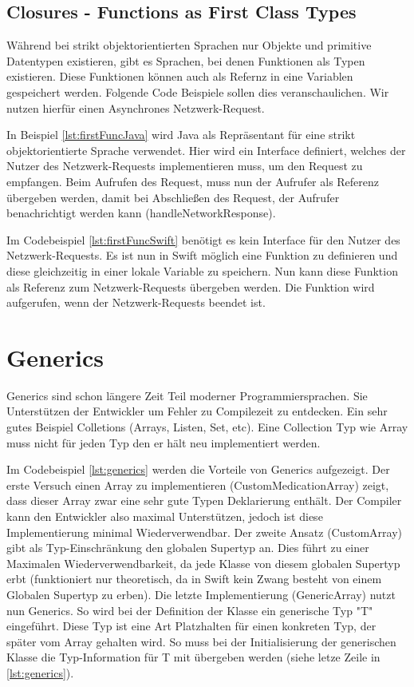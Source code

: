 \subsection{Closures - Functions as First Class Types}
Während bei strikt objektorientierten Sprachen nur Objekte und primitive Datentypen existieren, gibt es Sprachen, bei denen Funktionen als Typen existieren. Diese Funktionen können auch als Refernz in eine Variablen gespeichert werden. Folgende Code Beispiele sollen dies veranschaulichen. Wir nutzen hierfür einen Asynchrones Netzwerk-Request\cite{Apple:2014sp}.

 In Beispiel \ref{lst:firstFuncJava} wird Java als Repräsentant für eine strikt objektorientierte Sprache verwendet. Hier wird ein Interface definiert, welches der Nutzer des Netzwerk-Requests implementieren muss, um den Request zu empfangen. Beim Aufrufen des Request, muss nun der Aufrufer als Referenz übergeben werden, damit bei Abschließen des Request, der Aufrufer benachrichtigt werden kann (handleNetworkResponse). 

Im Codebeispiel \ref{lst:firstFuncSwift} benötigt es kein Interface für den Nutzer des Netzwerk-Requests. Es ist nun in Swift möglich eine Funktion zu definieren und diese gleichzeitig in einer lokale Variable zu speichern. Nun kann diese Funktion als Referenz zum Netzwerk-Requests übergeben werden. Die Funktion wird aufgerufen, wenn der Netzwerk-Requests beendet ist. 

\section{Generics}
Generics sind schon längere Zeit Teil moderner Programmiersprachen. Sie Unterstützen der Entwickler um Fehler zu Compilezeit zu entdecken. Ein sehr gutes Beispiel Colletions (Arrays, Listen, Set, etc). Eine Collection Typ wie Array muss nicht für jeden Typ den er hält neu implementiert werden.

Im Codebeispiel \ref{lst:generics} werden die Vorteile von Generics aufgezeigt. Der erste Versuch einen Array zu implementieren (CustomMedicationArray) zeigt, dass dieser Array zwar eine sehr gute Typen Deklarierung enthält. Der Compiler kann den Entwickler also maximal Unterstützen, jedoch ist diese Implementierung minimal Wiederverwendbar. Der zweite Ansatz (CustomArray) gibt als Typ-Einschränkung den globalen Supertyp an. Dies führt zu einer Maximalen Wiederverwendbarkeit, da jede Klasse von diesem globalen Supertyp erbt (funktioniert nur theoretisch, da in Swift kein Zwang besteht von einem Globalen Supertyp zu erben).
Die letzte Implementierung (GenericArray) nutzt nun Generics. So wird bei der Definition der Klasse ein generische Typ "T" eingeführt. Diese Typ ist eine Art Platzhalten für einen konkreten Typ, der später vom Array gehalten wird. So muss bei der Initialisierung der generischen Klasse die Typ-Information für T mit übergeben werden (siehe letze Zeile in \ref{lst:generics}).

